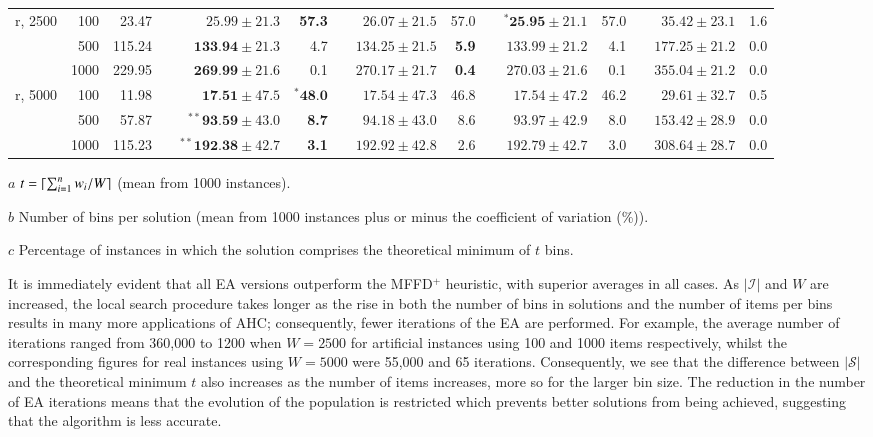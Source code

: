 \documentclass[a4paper,11pt,authoryear]{elsarticle}
\DeclarePairedDelimiter{\ceil}{\lceil}{\rceil}
\begin{document}
\begin{table}[h]
\begin{threeparttable}
{\begin{tabular}{crrcrrcrrcrrcrr}
	\midrule
	\midrule
	r, 2500 & 100 & 23.47 && $25.99 \pm 21.3$ & \textbf{57.3} && $26.07 \pm 21.5$ & 57.0 && $^{*}\textbf{25.95} \pm 21.1$ & 57.0 && $35.42 \pm 23.1$ & 1.6 \\
	& 500 & 115.24 && $\textbf{133.94} \pm 21.3$ & 4.7 && $134.25 \pm 21.5$ & \textbf{5.9} && $133.99 \pm 21.2$ & 4.1 && $177.25 \pm 21.2$ & 0.0 \\
	& 1000 & 229.95 && $\textbf{269.99} \pm 21.6$ & 0.1 && $270.17 \pm 21.7$ & \textbf{0.4} && $270.03 \pm 21.6$ & 0.1 && $355.04 \pm 21.2$ & 0.0 \\
	\midrule
	r, 5000 & 100 & 11.98 && $\textbf{17.51} \pm 47.5$ & $^{*}\textbf{48.0}$ && $17.54 \pm 47.3$ & 46.8 && $17.54 \pm 47.2$ & 46.2 && $29.61 \pm 32.7$ & 0.5 \\
	& 500 & 57.87 && $^{**}\textbf{93.59} \pm 43.0$ & \textbf{8.7} && $94.18 \pm 43.0$ & 8.6 && $93.97 \pm 42.9$ & 8.0 && $153.42 \pm 28.9$ & 0.0 \\
	& 1000 & 115.23 && $^{**}\textbf{192.38} \pm 42.7$ & \textbf{3.1} && $192.92 \pm 42.8$ & 2.6 && $192.79 \pm 42.7$ & 3.0 && $308.64 \pm 28.7$ & 0.0 \\
	\bottomrule
\end{tabular}}	
\vspace{0.2cm} %
\begin{tablenotes}
	\tiny
	\item[$a$] $t = \ceil{\sum_{i=1}^{n} w_i / W}$ (mean from 1000 instances).
	\item[$b$] Number of bins per solution (mean from 1000 instances plus or minus the coefficient of variation (\%)).
	\item[$c$] Percentage of instances in which the solution comprises the theoretical minimum of $t$ bins.
\end{tablenotes}
\end{threeparttable}
\label{table:ea}
\end{table}

\noindent It is immediately evident that all EA versions outperform the MFFD$^+$ heuristic, with superior averages in all cases. As $|\mathcal{I}|$ and $W$ are increased, the local search procedure takes longer as the rise in both the number of bins in solutions and the number of items per bins results in many more applications of AHC; consequently, fewer iterations of the EA are performed. For example, the average number of iterations ranged from 360,000 to 1200 when $W=2500$ for artificial instances using 100 and 1000 items respectively, whilst the corresponding figures for real instances using $W=5000$ were 55,000 and 65 iterations. Consequently, we see that the difference between $|\mathcal{S}|$ and the theoretical minimum $t$ also increases as the number of items increases, more so for the larger bin size. The reduction in the number of EA iterations means that the evolution of the population is restricted which prevents better solutions from being achieved, suggesting that the algorithm is less accurate.
\end{document}
